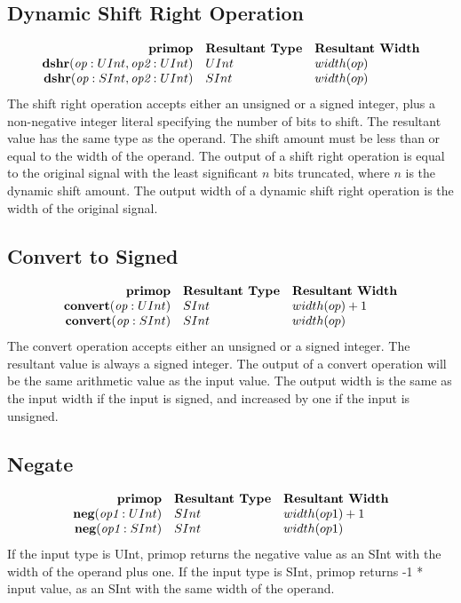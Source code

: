 \documentclass[10pt]{article}
\begin{document}
\subsection{Dynamic Shift Right Operation}
\[
\begin{array}{rll}
\text{\bf primop} & \text{\bf Resultant Type} & \text{\bf Resultant Width} \\
\text{\bf dshr}(\text{\em op}:UInt, \text{\em op2}:UInt)  & UInt & width(op) \\
\text{\bf dshr}(\text{\em op}:SInt, \text{\em op2}:UInt)  & SInt & width(op) \\
\end{array}
\]
The shift right operation accepts either an unsigned or a signed integer, plus a non-negative integer literal specifying the number of bits to shift.
The resultant value has the same type as the operand.
The shift amount must be less than or equal to the width of the operand.
The output of a shift right operation is equal to the original signal with the least significant $n$ bits truncated, where $n$ is the dynamic shift amount.
The output width of a dynamic shift right operation is the width of the original signal.

\subsection{Convert to Signed}
\[
\begin{array}{rll}
\text{\bf primop} & \text{\bf Resultant Type} & \text{\bf Resultant Width} \\
\text{\bf convert}(\text{\em op}:UInt)      & SInt & width(op) + 1 \\
\text{\bf convert}(\text{\em op}:SInt)      & SInt & width(op) \\
\end{array}
\]
The convert operation accepts either an unsigned or a signed integer.
The resultant value is always a signed integer.
The output of a convert operation will be the same arithmetic value as the input value.
The output width is the same as the input width if the input is signed, and increased by one if the input is unsigned.

\subsection{Negate}
\[
\begin{array}{rll}
\text{\bf primop} & \text{\bf Resultant Type} & \text{\bf Resultant Width} \\
\text{\bf neg}(\text{\em op1}:UInt)       & SInt & width(op1) + 1 \\
\text{\bf neg}(\text{\em op1}:SInt)       & SInt & width(op1) \\
\end{array}
\]
If the input type is UInt, primop returns the negative value as an SInt with the width of the operand plus one.
If the input type is SInt, primop returns -1 * input value, as an SInt with the same width of the operand.
\end{document}
